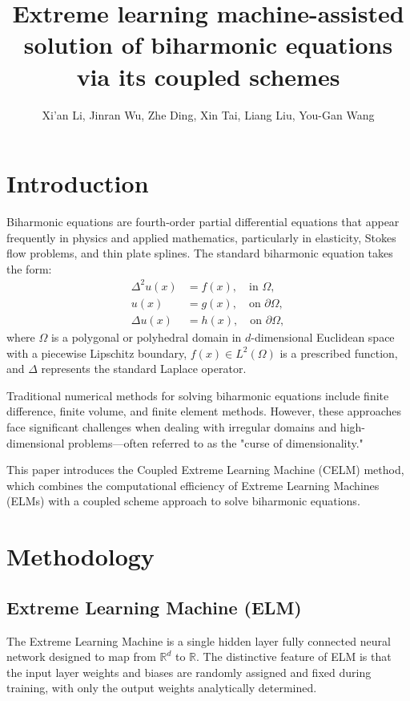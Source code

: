 \documentclass[11pt]{article}
\title{Extreme learning machine-assisted solution of biharmonic equations via its coupled schemes}
\author{Xi'an Li, Jinran Wu, Zhe Ding, Xin Tai, Liang Liu, You-Gan Wang}
\date{}
\begin{document}
\maketitle

\section{Introduction}

Biharmonic equations are fourth-order partial differential equations that appear frequently in physics and applied mathematics, particularly in elasticity, Stokes flow problems, and thin plate splines. The standard biharmonic equation takes the form:
\begin{align}
\Delta^2 u(x) &= f(x), \quad \text{in } \Omega, \\
u(x) &= g(x), \quad \text{on } \partial\Omega, \\
\Delta u(x) &= h(x), \quad \text{on } \partial\Omega,
\end{align}
where $\Omega$ is a polygonal or polyhedral domain in $d$-dimensional Euclidean space with a piecewise Lipschitz boundary, $f(x) \in L^2(\Omega)$ is a prescribed function, and $\Delta$ represents the standard Laplace operator.

Traditional numerical methods for solving biharmonic equations include finite difference, finite volume, and finite element methods. However, these approaches face significant challenges when dealing with irregular domains and high-dimensional problems—often referred to as the "curse of dimensionality."

This paper introduces the Coupled Extreme Learning Machine (CELM) method, which combines the computational efficiency of Extreme Learning Machines (ELMs) with a coupled scheme approach to solve biharmonic equations.

\section{Methodology}

\subsection{Extreme Learning Machine (ELM)}

The Extreme Learning Machine is a single hidden layer fully connected neural network designed to map from $\mathbb{R}^d$ to $\mathbb{R}$. The distinctive feature of ELM is that the input layer weights and biases are randomly assigned and fixed during training, with only the output weights analytically determined.
\end{document}
